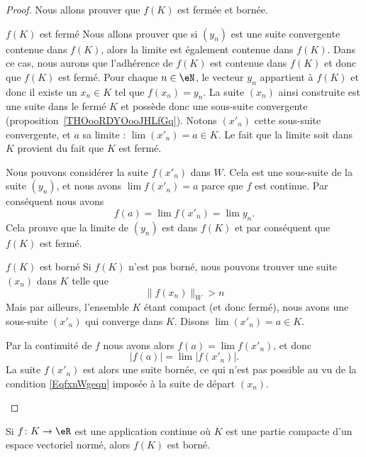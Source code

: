 \begin{proof}
	Nous allons prouver que $f(K)$ est fermée et bornée.
    \begin{subproof}
		\item[$f(K)$ est fermé] Nous allons prouver que si $(y_n)$ est une suite convergente contenue dans $f(K)$, alors la limite est également contenue dans $f(K)$. Dans ce cas, nous aurons que l'adhérence de $f(K)$ est contenue dans $f(K)$ et donc que $f(K)$ est fermé. Pour chaque $n\in\eN$, le vecteur $y_n$ appartient à $f(K)$ et donc il existe un $x_n\in K$ tel que $f(x_n)=y_n$. La suite $(x_n)$ ainsi construite est une suite dans le fermé $K$ et possède donc une sous-suite convergente (proposition~\ref{THOooRDYOooJHLfGq}). Notons $(x'_n)$ cette sous-suite convergente, et $a$ sa limite : $\lim(x'_n)=a\in K$. Le fait que la limite soit dans $K$ provient du fait que $K$ est fermé.

			Nous pouvons considérer la suite $f(x'_n)$ dans $W$. Cela est une sous-suite de la suite $(y_n)$, et nous avons $\lim f(x'_n)=a$ parce que $f$ est continue. Par conséquent nous avons
			\begin{equation}
				f(a)=\lim f(x'_n)=\lim y_n.
			\end{equation}
			Cela prouve que la limite de $(y_n)$ est dans $f(K)$ et par conséquent que $f(K)$ est fermé.

		\item[$f(K)$ est borné]
			Si $f(K)$ n'est pas borné, nous pouvons trouver une suite $(x_n)$ dans $K$ telle que
			\begin{equation}		\label{EqfxnWgeqn}
				\| f(x_n) \|_W>n
			\end{equation}
			Mais par ailleurs, l'ensemble $K$ étant compact (et donc fermé), nous avons une sous-suite $(x'_n)$ qui converge dans $K$. Disons $\lim(x'_n)=a\in K$.

			Par la continuité de $f$ nous avons alors $f(a)=\lim f(x'_n)$, et donc
			\begin{equation}
				| f(a) |=\lim | f(x'_n) |.
			\end{equation}
			La suite $f(x'_n)$ est alors une suite bornée, ce qui n'est pas possible au vu de la condition \eqref{EqfxnWgeqn} imposée à la suite de départ $(x_n)$.
    \end{subproof}
\end{proof}

\begin{corollary}	\label{CorFnContinueCompactBorne}
	Si $f\colon K\to \eR$ est une application continue où $K$ est une partie compacte d'un espace vectoriel normé, alors \( f(K)\) est borné.
\end{corollary}

